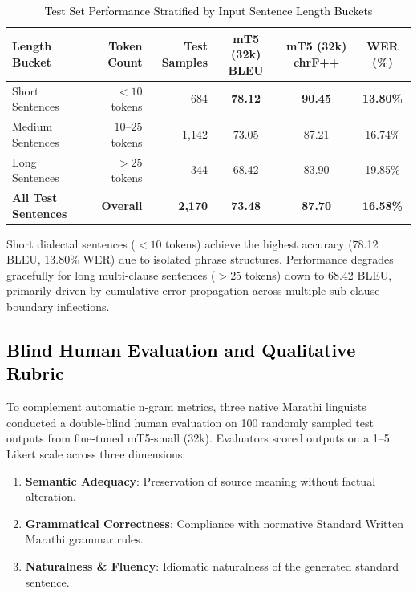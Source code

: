 \begin{table}[t]
\color{black}
\centering
\caption{\textcolor{black}{Test Set Performance Stratified by Input Sentence Length Buckets}}
\label{tab:length_buckets}
\begin{tabular}{lrrccc}
\hline
\textbf{Length Bucket} & \textbf{Token Count} & \textbf{Test Samples} & \textbf{mT5 (32k) BLEU} & \textbf{mT5 (32k) chrF++} & \textbf{WER (\%)} \\
\hline
Short Sentences & $< 10$ tokens & 684 & \textbf{78.12} & \textbf{90.45} & \textbf{13.80\%} \\
Medium Sentences & $10$--$25$ tokens & 1,142 & 73.05 & 87.21 & 16.74\% \\
Long Sentences & $> 25$ tokens & 344 & 68.42 & 83.90 & 19.85\% \\
\hline
\textbf{All Test Sentences} & \textbf{Overall} & \textbf{2,170} & \textbf{73.48} & \textbf{87.70} & \textbf{16.58\%} \\
\hline
\end{tabular}
\end{table}

Short dialectal sentences ($< 10$ tokens) achieve the highest accuracy (78.12 BLEU, 13.80\% WER) due to isolated phrase structures. Performance degrades gracefully for long multi-clause sentences ($> 25$ tokens) down to 68.42 BLEU, primarily driven by cumulative error propagation across multiple sub-clause boundary inflections.

\subsection{\textcolor{black}{Blind Human Evaluation and Qualitative Rubric}}

To complement automatic n-gram metrics, three native Marathi linguists conducted a double-blind human evaluation on 100 randomly sampled test outputs from fine-tuned mT5-small (32k). Evaluators scored outputs on a 1--5 Likert scale across three dimensions:
\begin{enumerate}
    \item \textbf{Semantic Adequacy}: Preservation of source meaning without factual alteration.
    \item \textbf{Grammatical Correctness}: Compliance with normative Standard Written Marathi grammar rules.
    \item \textbf{Naturalness \& Fluency}: Idiomatic naturalness of the generated standard sentence.
\end{enumerate}

